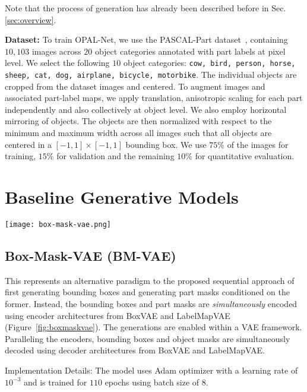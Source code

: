 \documentclass[runningheads]{llncs}
\begin{document}
\noindent Note that the process of generation has already been described before in Sec. \ref{sec:overview}.

\noindent \textbf{Dataset:} To train OPAL-Net, we use the PASCAL-Part dataset~\cite{chen2014detect}, containing $10{,}103$ images across $20$ object categories annotated with part labels at pixel level. We select the following $10$ object categories: \texttt{cow, bird, person, horse, sheep, cat, dog, airplane, bicycle, motorbike}. The individual objects are cropped from the dataset images and centered. To augment images and associated part-label maps, we apply translation, anisotropic scaling for each part independently and also collectively at object level. We also employ horizontal mirroring of objects. The objects are then normalized with respect to the minimum and maximum width across all images such that all objects are centered in a $[-1,1] \times [-1,1]$ bounding box. We use $75\%$ of the images for training, $15\%$ for validation and the remaining $10\%$ for quantitative evaluation.

\section{Baseline Generative Models}
\label{sec:baselines}

\begin{figure*}[!ht]
  \centering
  \texttt{[image: box-mask-vae.png]}
  \caption{The architecture for Box-Mask-VAE baseline which simultaneously generates bounding boxes and object part masks. The pink arrows indicate the data flow for the generative model.}
  \label{fig:boxmaskvae}
\end{figure*}

\subsection{Box-Mask-VAE (BM-VAE)}

This represents an alternative paradigm to the proposed sequential approach of first generating bounding boxes and generating part masks conditioned on the former. Instead, the bounding boxes and part masks are \textit{simultaneously} encoded using encoder architectures from BoxVAE and LabelMapVAE (Figure~\ref{fig:boxmaskvae}). The generations are enabled within a VAE framework. Paralleling the encoders, bounding boxes and object masks are simultaneously decoded using decoder architectures from BoxVAE and LabelMapVAE.

\noindent Implementation Details: The model uses Adam optimizer with a learning rate of $10^{-3}$ and is trained for $110$ epochs using batch size of $8$.
\end{document}
